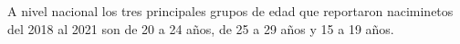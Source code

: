 A nivel nacional los tres principales grupos de edad que reportaron naciminetos del 2018 al 2021 son de 20 a 24 años, de 25 a 29 años y 15 a 19 años.  